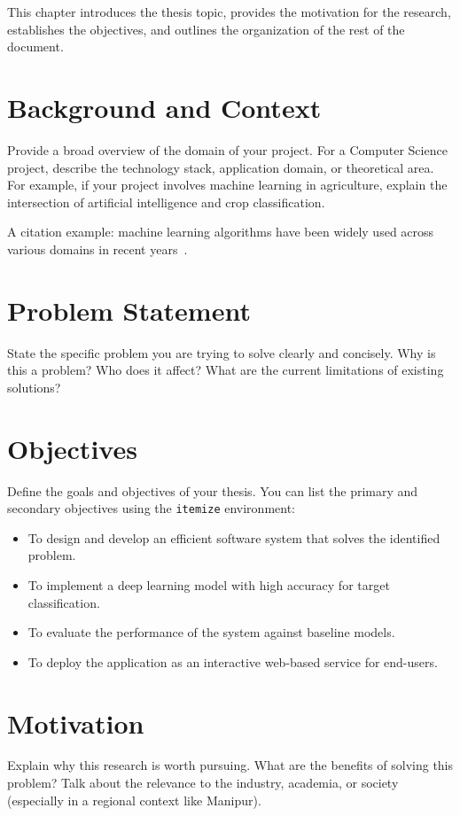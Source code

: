 This chapter introduces the thesis topic, provides the motivation for the research, establishes the objectives, and outlines the organization of the rest of the document.

\section{Background and Context}
Provide a broad overview of the domain of your project. For a Computer Science project, describe the technology stack, application domain, or theoretical area. For example, if your project involves machine learning in agriculture, explain the intersection of artificial intelligence and crop classification.

A citation example: machine learning algorithms have been widely used across various domains in recent years~\cite{kamilaris2018deep, mohanty2016plant}.

\section{Problem Statement}
State the specific problem you are trying to solve clearly and concisely. Why is this a problem? Who does it affect? What are the current limitations of existing solutions?

\section{Objectives}
Define the goals and objectives of your thesis. You can list the primary and secondary objectives using the \texttt{itemize} environment:
\begin{itemize}
    \item To design and develop an efficient software system that solves the identified problem.
    \item To implement a deep learning model with high accuracy for target classification.
    \item To evaluate the performance of the system against baseline models.
    \item To deploy the application as an interactive web-based service for end-users.
\end{itemize}

\section{Motivation}
Explain why this research is worth pursuing. What are the benefits of solving this problem? Talk about the relevance to the industry, academia, or society (especially in a regional context like Manipur).

